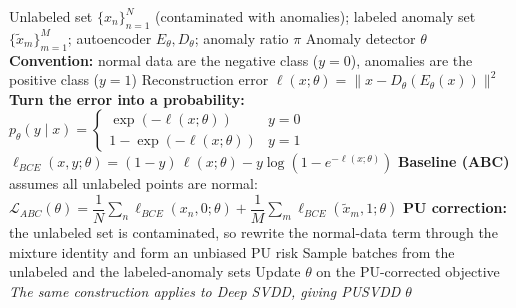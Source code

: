 \documentclass{article}
\begin{document}
\begin{algorithm}[!h]
\renewcommand{\algorithmicrequire}{\textbf{Input:}}
\renewcommand{\algorithmicensure}{\textbf{Output:}}
	\caption{PUAE (deep PU anomaly detection for contaminated unlabeled data)}
	\begin{algorithmic}[1]
	    \REQUIRE
	    Unlabeled set $\{x_{n}\}_{n=1}^{N}$ (contaminated with anomalies);
	    labeled anomaly set $\{\tilde{x}_{m}\}_{m=1}^{M}$;
	    autoencoder $E_{\theta},D_{\theta}$; anomaly ratio $\pi$
	    \ENSURE
	    Anomaly detector $\theta$
	    \STATE \textbf{Convention:} normal data are the negative class ($y=0$),
	    anomalies are the positive class ($y=1$) %
	    \STATE Reconstruction error $\ell(x;\theta)=\|x-D_{\theta}(E_{\theta}(x))\|^{2}$
	    \STATE \textbf{Turn the error into a probability:}
	    \STATE \quad $p_{\theta}(y\mid x)=\begin{cases}
	    \exp(-\ell(x;\theta)) & y=0\\
	    1-\exp(-\ell(x;\theta)) & y=1\end{cases}$ %
	    \STATE \quad $\ell_{BCE}(x,y;\theta)=(1-y)\,\ell(x;\theta)-y\log\!\left(1-e^{-\ell(x;\theta)}\right)$ %
	    \STATE \textbf{Baseline (ABC)} assumes all unlabeled points are normal:
	    \STATE \quad $\mathcal{L}_{ABC}(\theta)=\dfrac{1}{N}\sum_{n}\ell_{BCE}(x_{n},0;\theta)
	    +\dfrac{1}{M}\sum_{m}\ell_{BCE}(\tilde{x}_{m},1;\theta)$
	    \STATE \textbf{PU correction:} the unlabeled set is contaminated, so rewrite the normal-data
	    term through the mixture identity and form an unbiased PU risk %
	    \STATE Sample batches from the unlabeled and the labeled-anomaly sets
	    \STATE Update $\theta$ on the PU-corrected objective
	    \ENDWHILE
	    \STATE \emph{The same construction applies to Deep SVDD, giving PUSVDD} %
		\RETURN $\theta$
	\end{algorithmic}
\end{algorithm}
\end{document}
